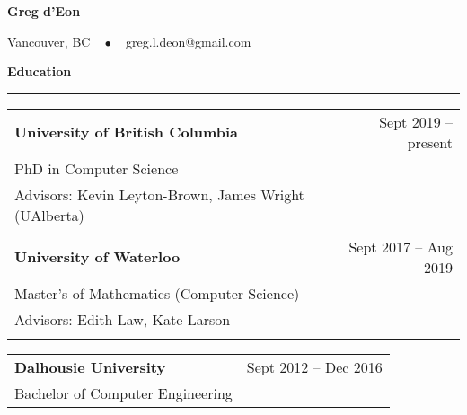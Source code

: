 \documentclass{article}
\newcommand{\heading}[1]
{
	\vspace{3pt}
	{\bf #1} 
	\vspace{-6pt}
	
	\rule{\linewidth}{0.4pt}
}
\begin{document}
\begin{center}
{\Large\textbf{Greg d'Eon}}

\vspace{0.2cm}
Vancouver, BC ~ $\bullet$ ~ 
greg.l.deon@gmail.com

\end{center}


\heading{Education}
\begin{center}
\begin{tabularx}{\textwidth}{Xr}
    \textbf{University of British Columbia} & Sept 2019 -- present \\
    PhD in Computer Science \\
    Advisors: Kevin Leyton-Brown, James Wright (UAlberta) \\
    \\

	\textbf{University of Waterloo}	& Sept 2017 -- Aug 2019 \\
	Master's of Mathematics (Computer Science) \\
	Advisors: Edith Law, Kate Larson \\
	\\
\end{tabularx}
\begin{tabularx}{\textwidth}{Xr}
	\textbf{Dalhousie University}	& Sept 2012 -- Dec 2016 \\
	Bachelor of Computer Engineering \\
\end{tabularx}
\end{center}
\end{document}
